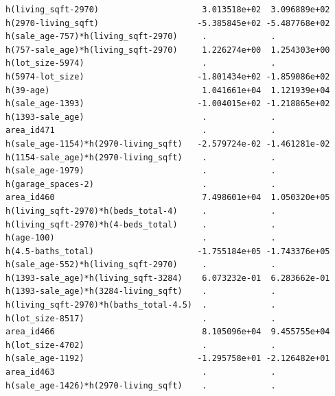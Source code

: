 \documentclass[
]{article}
\begin{document}
\begin{verbatim}
h(living_sqft-2970)                     3.013518e+02  3.096889e+02
h(2970-living_sqft)                    -5.385845e+02 -5.487768e+02
h(sale_age-757)*h(living_sqft-2970)     .             .           
h(757-sale_age)*h(living_sqft-2970)     1.226274e+00  1.254303e+00
h(lot_size-5974)                        .             .           
h(5974-lot_size)                       -1.801434e+02 -1.859086e+02
h(39-age)                               1.041661e+04  1.121939e+04
h(sale_age-1393)                       -1.004015e+02 -1.218865e+02
h(1393-sale_age)                        .             .           
area_id471                              .             .           
h(sale_age-1154)*h(2970-living_sqft)   -2.579724e-02 -1.461281e-02
h(1154-sale_age)*h(2970-living_sqft)    .             .           
h(sale_age-1979)                        .             .           
h(garage_spaces-2)                      .             .           
area_id460                              7.498601e+04  1.050320e+05
h(living_sqft-2970)*h(beds_total-4)     .             .           
h(living_sqft-2970)*h(4-beds_total)     .             .           
h(age-100)                              .             .           
h(4.5-baths_total)                     -1.755184e+05 -1.743376e+05
h(sale_age-552)*h(living_sqft-2970)     .             .           
h(1393-sale_age)*h(living_sqft-3284)    6.073232e-01  6.283662e-01
h(1393-sale_age)*h(3284-living_sqft)    .             .           
h(living_sqft-2970)*h(baths_total-4.5)  .             .           
h(lot_size-8517)                        .             .           
area_id466                              8.105096e+04  9.455755e+04
h(lot_size-4702)                        .             .           
h(sale_age-1192)                       -1.295758e+01 -2.126482e+01
area_id463                              .             .           
h(sale_age-1426)*h(2970-living_sqft)    .             .           
                                                                  

\end{verbatim}
\end{document}
